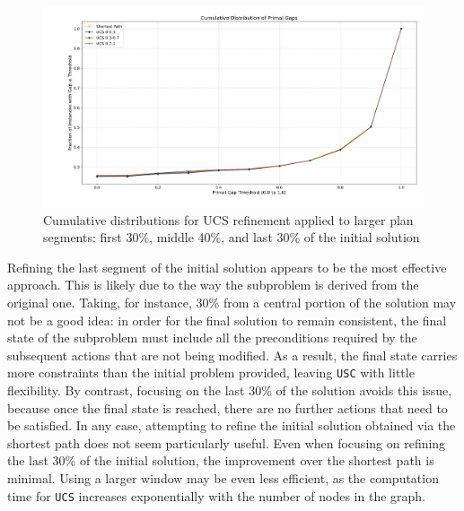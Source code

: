 \begin{figure}[ht]
	\centering
	\includegraphics[width=\textwidth]{images/ucs_3_intervals.png}
	\caption{Cumulative distributions for UCS refinement applied to larger plan segments: first 30\%, middle 40\%, and last 30\% of the initial solution}
	\label{fig:ucs_3intervals}
\end{figure}

Refining the last segment of the initial solution appears to be the most effective approach. This is likely due to the way the subproblem is derived from
the original one. Taking, for instance, 30\% from a central portion of the solution may not be a good idea: in order for the final solution to remain
consistent, the final state of the subproblem must include all the preconditions required by the subsequent actions that are not being modified.
As a result, the final state carries more constraints than the initial problem provided, leaving \verb|USC| with little flexibility. By contrast,
focusing on the last 30\% of the solution avoids this issue, because once the final state is reached, there are no further actions that need to be satisfied.
In any case, attempting to refine the initial solution obtained via the shortest path does not seem particularly useful. Even when focusing on refining
the last 30\% of the initial solution, the improvement over the shortest path is minimal. Using a larger window may be even less efficient,
as the computation time for \verb|UCS| increases exponentially with the number of nodes in the graph.
